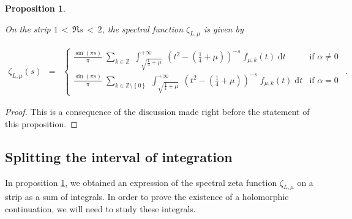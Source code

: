 \documentclass{jams-l}
\newtheorem{proposition}[theorem]{Proposition}
\theoremstyle{definition}
\theoremstyle{remark}
\numberwithin{equation}{section}
\begin{document}
        \begin{proposition}
        \label{PropSpectralZetaIntegralRepresentation2}
        
            On the strip $1 \, < \, \Re s \, < \, 2$, the spectral function $\zeta_{L, \mu}$ is given by
            
            \[ \begin{array}{lll}
                    \zeta_{L, \mu} \left( s \right) & = & \left \{ \begin{array}{ll} \frac{\sin \left( \pi s \right)}{\pi} \; \sum\limits_{k \in \mathbb{Z}} \; \int_{\sqrt{\frac{1}{4}+\mu}}^{+\infty} \; \left( t^2 - \left( \frac{1}{4} + \mu \right) \right)^{-s} \; f_{\mu,k} \left( t \right) \; \text{d}t & \text{if } \alpha \neq 0 \\[1em] \frac{\sin \left( \pi s \right)}{\pi} \; \sum\limits_{k \in \mathbb{Z} \setminus \left \{ 0 \right \}} \; \int_{\sqrt{\frac{1}{4}+\mu}}^{+\infty} \; \left( t^2 - \left( \frac{1}{4} + \mu \right) \right)^{-s} \; f_{\mu,k} \left( t \right) \; \text{d}t & \text{if } \alpha = 0 \end{array} \right.
                \end{array} . \]
        
        \end{proposition}
        
        \begin{proof}
        
            This is a consequence of the discussion made right before the statement of this proposition.
        
        \end{proof}
        
    
    \subsection{Splitting the interval of integration}
    \label{SubSecSplittingIntervalOfIntegration}
    
        In proposition \ref{PropSpectralZetaIntegralRepresentation2}, we obtained an expression of the spectral zeta function $\zeta_{L, \mu}$ on a strip as a sum of integrals. In order to prove the existence of a holomorphic continuation, we will need to study these integrals.
        
\end{document}
